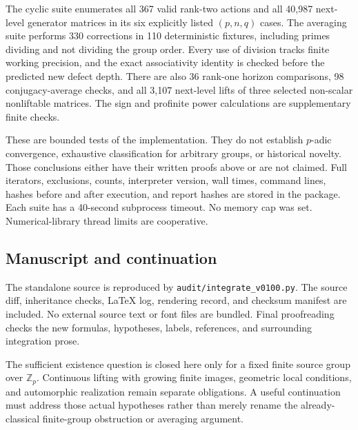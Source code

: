 The cyclic suite enumerates all 367 valid rank-two actions and all 40,987 next-level generator matrices in its six explicitly listed $(p,n,q)$ cases. The averaging suite performs 330 corrections in 110 deterministic fixtures, including primes dividing and not dividing the group order. Every use of division tracks finite working precision, and the exact associativity identity is checked before the predicted new defect depth. There are also 36 rank-one horizon comparisons, 98 conjugacy-average checks, and all 3,107 next-level lifts of three selected non-scalar nonliftable matrices. The sign and profinite power calculations are supplementary finite checks.

These are bounded tests of the implementation. They do not establish $p$-adic convergence, exhaustive classification for arbitrary groups, or historical novelty. Those conclusions either have their written proofs above or are not claimed. Full iterators, exclusions, counts, interpreter version, wall times, command lines, hashes before and after execution, and report hashes are stored in the package. Each suite has a 40-second subprocess timeout. No memory cap was set. Numerical-library thread limits are cooperative.

\subsection{Manuscript and continuation}
The standalone source is reproduced by \texttt{audit/integrate\_v0100.py}. The source diff, inheritance checks, LaTeX log, rendering record, and checksum manifest are included. No external source text or font files are bundled. Final proofreading checks the new formulas, hypotheses, labels, references, and surrounding integration prose.

The sufficient existence question is closed here only for a fixed finite source group over $\mathbb Z_p$. Continuous lifting with growing finite images, geometric local conditions, and automorphic realization remain separate obligations. A useful continuation must address those actual hypotheses rather than merely rename the already-classical finite-group obstruction or averaging argument.

